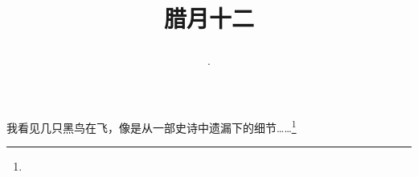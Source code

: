 \title{\date[d=22,m=1,y=2024][year:cn-y,年,month:cn,day:cn,日,·,weekday]·腊月十二 }
我看见几只黑鸟在飞，像是从一部史诗中遗漏下的细节……\footnote{ }


